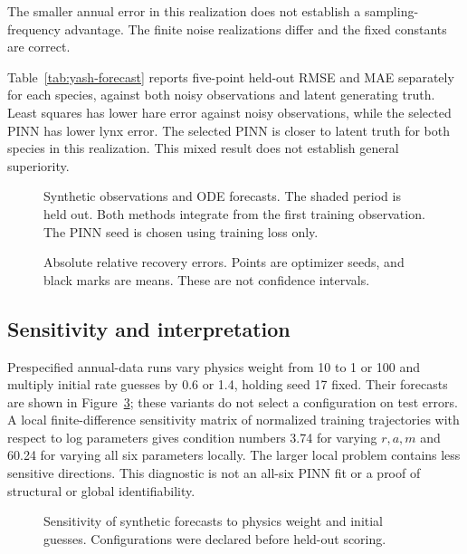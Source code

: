 The smaller annual error in this realization does not establish a sampling-frequency
advantage. The finite noise realizations differ and the fixed constants are correct.
\begin{table}[htbp]\centering
\caption{Synthetic parameter recovery across optimizer seeds, conditional on correct fixed constants.}
\label{tab:yash-recovery}
\end{table}

Table~\ref{tab:yash-forecast} reports five-point held-out RMSE and MAE separately for each
species, against both noisy observations and latent generating truth. Least squares
has lower hare error against noisy observations, while the selected PINN has lower
lynx error. The selected PINN is closer to latent truth for both species in this
realization. This mixed result does not establish general superiority.
\begin{table}[htbp]\centering\small
\caption{Frozen ODE forecasts for five synthetic held-out years. H and P denote hare and lynx indices.}
\label{tab:yash-forecast}
\end{table}
\begin{figure}[htbp]\centering
{}
\caption{Synthetic observations and ODE forecasts. The shaded period is held out.
Both methods integrate from the first training observation. The PINN seed is chosen
using training loss only.}\label{fig:yash-forecast}
\end{figure}
\begin{figure}[htbp]\centering
{}
\caption{Absolute relative recovery errors. Points are optimizer seeds, and black
marks are means. These are not confidence intervals.}\label{fig:yash-recovery}
\end{figure}

\subsection{Sensitivity and interpretation}
Prespecified annual-data runs vary physics weight from 10 to 1 or 100 and multiply
initial rate guesses by 0.6 or 1.4, holding seed 17 fixed. Their forecasts are shown in
Figure~\ref{fig:yash-sensitivity}; these variants do not select a configuration on test
errors. A local finite-difference sensitivity matrix of normalized training trajectories
with respect to log parameters gives condition numbers
3.74 for varying $r,a,m$ and 60.24 for varying all six parameters locally.
The larger local problem contains less sensitive directions. This diagnostic is not
an all-six PINN fit or a proof of structural or global identifiability.
\begin{figure}[htbp]\centering
{}
\caption{Sensitivity of synthetic forecasts to physics weight and initial guesses.
Configurations were declared before held-out scoring.}\label{fig:yash-sensitivity}
\end{figure}

